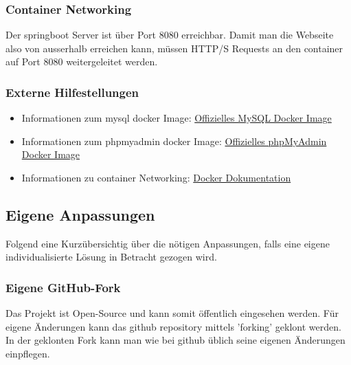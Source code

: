 \documentclass[../main.tex]{subfiles}
\begin{document}
	\subsubsection{Container Networking}
	Der \gls{springboot} Server ist über Port 8080 erreichbar. Damit man die Webseite also von ausserhalb erreichen kann, müssen HTTP/S Requests an den \gls{container} auf Port 8080 weitergeleitet werden.
	
	\subsubsection{Externe Hilfestellungen}
	\begin{itemize}
		\item Informationen zum \gls{mysql} \gls{docker} Image: \href{https://hub.docker.com/_/mysql}{Offizielles MySQL Docker Image}
		\item Informationen zum \gls{phpmyadmin} \gls{docker} Image: \href{https://hub.docker.com/r/phpmyadmin/phpmyadmin/}{Offizielles phpMyAdmin Docker Image}
		\item Informationen zu \gls{container} Networking: \href{https://docs.docker.com/config/containers/container-networking/}{Docker Dokumentation}
	\end{itemize}
	
	
	\subsection{Eigene Anpassungen}
	Folgend eine Kurzübersichtig über die nötigen Anpassungen, falls eine eigene individualisierte Lösung in Betracht gezogen wird.
	\subsubsection{Eigene GitHub-Fork}
	Das Projekt ist Open-Source und kann somit öffentlich eingesehen werden. Für eigene Änderungen kann das \gls{github} \gls{repository} mittels 'forking' geklont werden. In der geklonten Fork kann man wie bei \gls{github} üblich seine eigenen Änderungen einpflegen.
\end{document}
